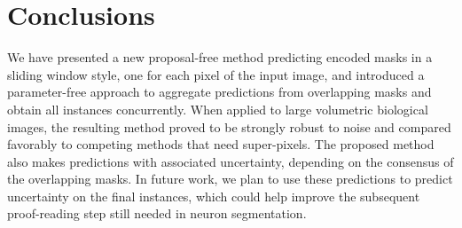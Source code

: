 
\section{Conclusions}
We have presented a new proposal-free method predicting encoded \maskname masks in a sliding window style, one for each pixel of the input image, and introduced a parameter-free approach to aggregate predictions from overlapping masks and obtain all instances concurrently.
When applied to large volumetric biological images, the resulting method proved to be strongly robust to noise and compared favorably to competing methods that need super-pixels.
The proposed method also makes predictions with associated uncertainty, depending on the consensus of the overlapping \maskname masks. In future work, we plan to use these predictions to predict uncertainty on the final instances, which could help improve the subsequent proof-reading step still needed in neuron segmentation.
